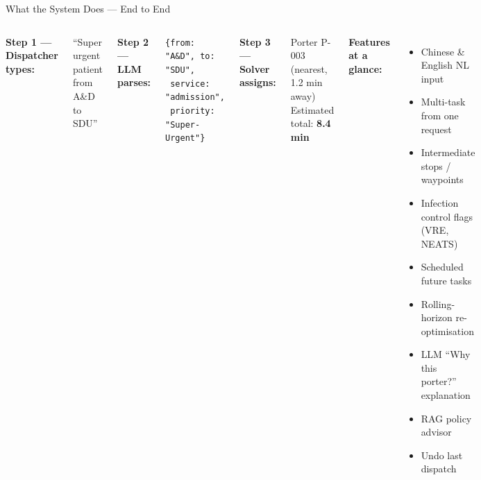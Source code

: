 \documentclass[aspectratio=169,14pt]{beamer}
\newcommand{\tick}{\textcolor{okgreen}{\textbf{\checkmark}}}
\begin{document}
\begin{frame}{What the System Does — End to End}
\begin{columns}

\textbf{Step 1 — Dispatcher types:}
\begin{exampleblock}{}
  \small``Super urgent patient from A\&D to SDU''
\end{exampleblock}

\vspace{0.3cm}
\textbf{Step 2 — LLM parses:}
\begin{exampleblock}{}
  \small\texttt{\{from: "A\&D", to: "SDU",}\\
  \texttt{ service: "admission",}\\
  \texttt{ priority: "Super-Urgent"\}}
\end{exampleblock}

\vspace{0.3cm}
\textbf{Step 3 — Solver assigns:}
\begin{exampleblock}{}
  \small Porter P-003 (nearest, 1.2 min away)\\
  Estimated total: \textbf{8.4 min}
\end{exampleblock}

\textbf{Features at a glance:}
\begin{itemize}
  \setlength{\itemsep}{5pt}
  \item[\tick] Chinese \& English NL input
  \item[\tick] Multi-task from one request
  \item[\tick] Intermediate stops / waypoints
  \item[\tick] Infection control flags (VRE, NEATS)
  \item[\tick] Scheduled future tasks
  \item[\tick] Rolling-horizon re-optimisation
  \item[\tick] LLM ``Why this porter?'' explanation
  \item[\tick] RAG policy advisor
  \item[\tick] Undo last dispatch
\end{itemize}
\end{columns}
\end{frame}

\end{document}
